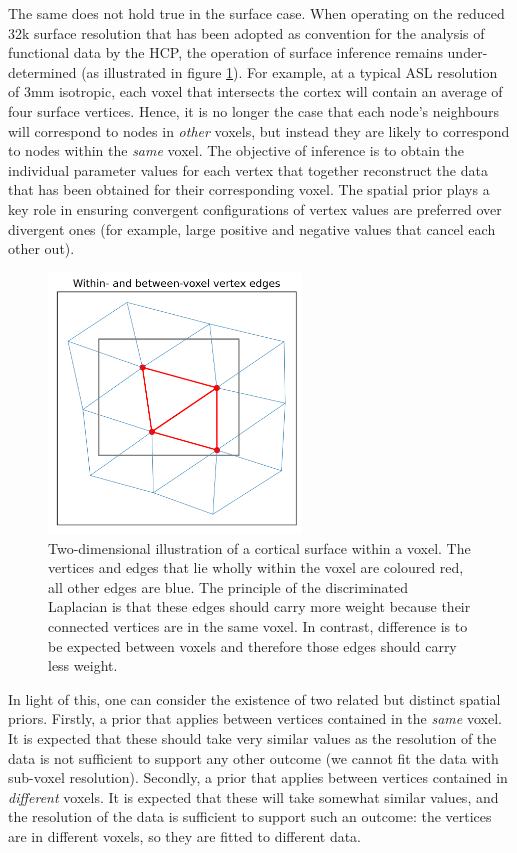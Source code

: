 \documentclass[12pt]{report}
\begin{document}
The same does not hold true in the surface case. When operating on the reduced 32k surface resolution that has been adopted as convention for the analysis of functional data by the HCP, the operation of surface inference remains under-determined (as illustrated in figure \ref{disc_lap_edges}). For example, at a typical ASL resolution of 3mm isotropic, each voxel that intersects the cortex will contain an average of four surface vertices. Hence, it is no longer the case that each node's neighbours will correspond to nodes in \textit{other} voxels, but instead they are likely to correspond to nodes within the \textit{same} voxel. The objective of inference is to obtain the individual parameter values for each vertex that together reconstruct the data that has been obtained for their corresponding voxel. The spatial prior plays a key role in ensuring convergent configurations of vertex values are preferred over divergent ones (for example, large positive and negative values that cancel each other out). 

\begin{figure}
\centering
\includegraphics[width=0.6\textwidth]{disc_lap_edges.png}
\caption{Two-dimensional illustration of a cortical surface within a voxel. The vertices and edges that lie wholly within the voxel are coloured red, all other edges are blue. The principle of the discriminated Laplacian is that these edges should carry more weight because their connected vertices are in the same voxel. In contrast, difference is to be expected between voxels and therefore those edges should carry less weight.}
\label{disc_lap_edges} 
\end{figure}

In light of this, one can consider the existence of two related but distinct spatial priors. Firstly, a prior that applies between vertices contained in the \textit{same} voxel. It is expected that these should take very similar values as the resolution of the  data is not sufficient to support any other outcome (we cannot fit the data with sub-voxel resolution). Secondly, a prior that applies between vertices contained in \textit{different} voxels. It is expected that these will take somewhat similar values, and the resolution of the data is sufficient to support such an outcome: the vertices are in different voxels, so they are fitted to different data. 
\end{document}
